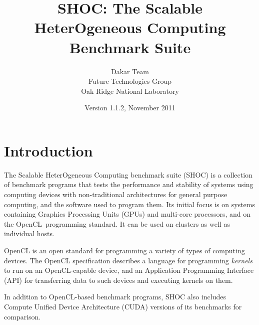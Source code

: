 \documentclass[11pt]{article}
\begin{document}
\title{SHOC: The Scalable HeterOgeneous Computing Benchmark Suite}
\author{Dakar Team\\Future Technologies Group\\Oak Ridge National Laboratory}
\date{Version 1.1.2, November 2011}
\maketitle

\section{Introduction}

The Scalable HeterOgeneous Computing benchmark suite (SHOC) is a collection of
benchmark programs that tests the performance and stability of systems using 
computing devices with non-traditional architectures for general purpose 
computing, and the software used to program them. Its initial focus is on 
systems containing Graphics Processing Units (GPUs) and multi-core 
processors, and on the OpenCL\,\cite{openclspec} programming standard.
It can be used on clusters as well as individual hosts.

OpenCL is an open standard for programming a variety of types of computing 
devices. The OpenCL specification describes a language for programming 
\emph{kernels} to run on an OpenCL-capable device, and an 
Application Programming Interface (API) for transferring data to such 
devices and executing kernels on them. 


In addition to OpenCL-based benchmark programs, SHOC also includes
Compute Unified Device Architecture (CUDA)\cite{cuda} versions
of its benchmarks for comparison.


\end{document}

